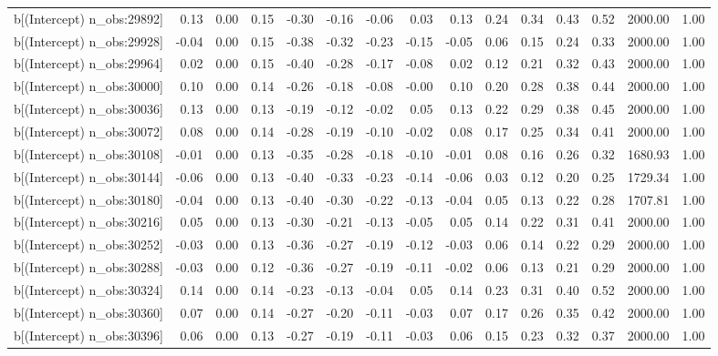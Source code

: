 \begin{table}[ht]
\begin{tabular}{rrrrrrrrrrrrrrr}
  b[(Intercept) n\_obs:29892] & 0.13 & 0.00 & 0.15 & -0.30 & -0.16 & -0.06 & 0.03 & 0.13 & 0.24 & 0.34 & 0.43 & 0.52 & 2000.00 & 1.00 \\ 
  b[(Intercept) n\_obs:29928] & -0.04 & 0.00 & 0.15 & -0.38 & -0.32 & -0.23 & -0.15 & -0.05 & 0.06 & 0.15 & 0.24 & 0.33 & 2000.00 & 1.00 \\ 
  b[(Intercept) n\_obs:29964] & 0.02 & 0.00 & 0.15 & -0.40 & -0.28 & -0.17 & -0.08 & 0.02 & 0.12 & 0.21 & 0.32 & 0.43 & 2000.00 & 1.00 \\ 
  b[(Intercept) n\_obs:30000] & 0.10 & 0.00 & 0.14 & -0.26 & -0.18 & -0.08 & -0.00 & 0.10 & 0.20 & 0.28 & 0.38 & 0.44 & 2000.00 & 1.00 \\ 
  b[(Intercept) n\_obs:30036] & 0.13 & 0.00 & 0.13 & -0.19 & -0.12 & -0.02 & 0.05 & 0.13 & 0.22 & 0.29 & 0.38 & 0.45 & 2000.00 & 1.00 \\ 
  b[(Intercept) n\_obs:30072] & 0.08 & 0.00 & 0.14 & -0.28 & -0.19 & -0.10 & -0.02 & 0.08 & 0.17 & 0.25 & 0.34 & 0.41 & 2000.00 & 1.00 \\ 
  b[(Intercept) n\_obs:30108] & -0.01 & 0.00 & 0.13 & -0.35 & -0.28 & -0.18 & -0.10 & -0.01 & 0.08 & 0.16 & 0.26 & 0.32 & 1680.93 & 1.00 \\ 
  b[(Intercept) n\_obs:30144] & -0.06 & 0.00 & 0.13 & -0.40 & -0.33 & -0.23 & -0.14 & -0.06 & 0.03 & 0.12 & 0.20 & 0.25 & 1729.34 & 1.00 \\ 
  b[(Intercept) n\_obs:30180] & -0.04 & 0.00 & 0.13 & -0.40 & -0.30 & -0.22 & -0.13 & -0.04 & 0.05 & 0.13 & 0.22 & 0.28 & 1707.81 & 1.00 \\ 
  b[(Intercept) n\_obs:30216] & 0.05 & 0.00 & 0.13 & -0.30 & -0.21 & -0.13 & -0.05 & 0.05 & 0.14 & 0.22 & 0.31 & 0.41 & 2000.00 & 1.00 \\ 
  b[(Intercept) n\_obs:30252] & -0.03 & 0.00 & 0.13 & -0.36 & -0.27 & -0.19 & -0.12 & -0.03 & 0.06 & 0.14 & 0.22 & 0.29 & 2000.00 & 1.00 \\ 
  b[(Intercept) n\_obs:30288] & -0.03 & 0.00 & 0.12 & -0.36 & -0.27 & -0.19 & -0.11 & -0.02 & 0.06 & 0.13 & 0.21 & 0.29 & 2000.00 & 1.00 \\ 
  b[(Intercept) n\_obs:30324] & 0.14 & 0.00 & 0.14 & -0.23 & -0.13 & -0.04 & 0.05 & 0.14 & 0.23 & 0.31 & 0.40 & 0.52 & 2000.00 & 1.00 \\ 
  b[(Intercept) n\_obs:30360] & 0.07 & 0.00 & 0.14 & -0.27 & -0.20 & -0.11 & -0.03 & 0.07 & 0.17 & 0.26 & 0.35 & 0.42 & 2000.00 & 1.00 \\ 
  b[(Intercept) n\_obs:30396] & 0.06 & 0.00 & 0.13 & -0.27 & -0.19 & -0.11 & -0.03 & 0.06 & 0.15 & 0.23 & 0.32 & 0.37 & 2000.00 & 1.00 \\ 

\end{tabular}
\end{table}
